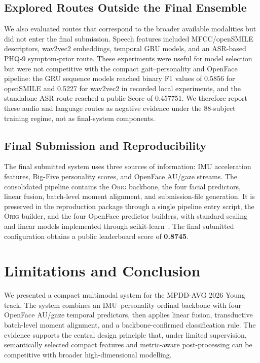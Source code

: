 \documentclass[sigconf,screen,review]{acmart}
\begin{document}
\subsection{Explored Routes Outside the Final Ensemble}
\label{sec:exp-negative}

We also evaluated routes that correspond to the broader available modalities but
did not enter the final submission. Speech features included MFCC/openSMILE
descriptors, wav2vec2 embeddings, temporal GRU models, and an ASR-based PHQ-9
symptom-prior route. These experiments were useful for model selection but were
not competitive with the compact gait--personality and OpenFace pipeline: the
GRU sequence models reached binary F1 values of 0.5856 for openSMILE and 0.5227
for wav2vec2 in recorded local experiments, and the standalone ASR route reached
a public Score of 0.457751. We therefore report these audio and language routes
as negative evidence under the 88-subject training regime, not as final-system
components.

\subsection{Final Submission and Reproducibility}
\label{sec:exp-final}

The final submitted system uses three sources of information: IMU acceleration
features, Big-Five personality scores, and OpenFace AU/gaze streams. The
consolidated pipeline contains the \textsc{Orig} backbone, the four facial
predictors, linear fusion, batch-level moment alignment, and submission-file
generation. It is preserved in the reproduction package through a single
pipeline entry script, the \textsc{Orig} builder, and the four OpenFace predictor
builders, with standard scaling and linear models implemented through
scikit-learn~\cite{pedregosa2011scikit}. The final submitted configuration
obtains a public leaderboard score of \textbf{0.8745}.



\section{Limitations and Conclusion}
\label{sec:conclusion}

We presented a compact multimodal system for the MPDD-AVG 2026 Young track.
The system combines an IMU--personality ordinal backbone with four OpenFace
AU/gaze temporal predictors, then applies linear fusion, transductive
batch-level moment alignment, and a backbone-confirmed classification rule. The
evidence supports the central design principle that, under limited supervision,
semantically selected compact features and metric-aware post-processing can be
competitive with broader high-dimensional modelling.
\end{document}

